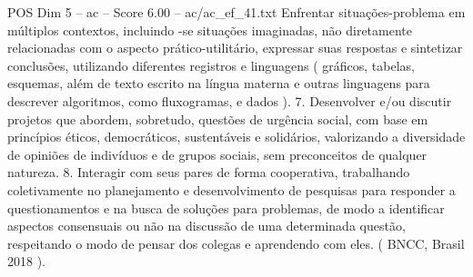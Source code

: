 \begin{textsample}{POS Dim 5 – ac – Score 6.00 – ac/ac\_ef\_41.txt}
Enfrentar situações-problema em múltiplos contextos, incluindo -se situações imaginadas, não diretamente relacionadas com o aspecto prático-utilitário, expressar suas respostas e sintetizar conclusões, utilizando diferentes registros e linguagens ( gráficos, tabelas, esquemas, além de texto escrito na língua materna e outras linguagens para descrever algoritmos, como fluxogramas, e dados ). 7.
Desenvolver e/ou discutir projetos que abordem, sobretudo, questões de urgência social, com base em princípios éticos, democráticos, sustentáveis e solidários, valorizando a diversidade de opiniões de indivíduos e de grupos sociais, sem preconceitos de qualquer natureza. 8.
Interagir com seus pares de forma cooperativa, trabalhando coletivamente no planejamento e desenvolvimento de pesquisas para responder a questionamentos e na busca de soluções para problemas, de modo a identificar aspectos consensuais ou não na discussão de uma determinada questão, respeitando o modo de pensar dos colegas e aprendendo com eles. ( BNCC, Brasil 2018 ).

\end{textsample}

